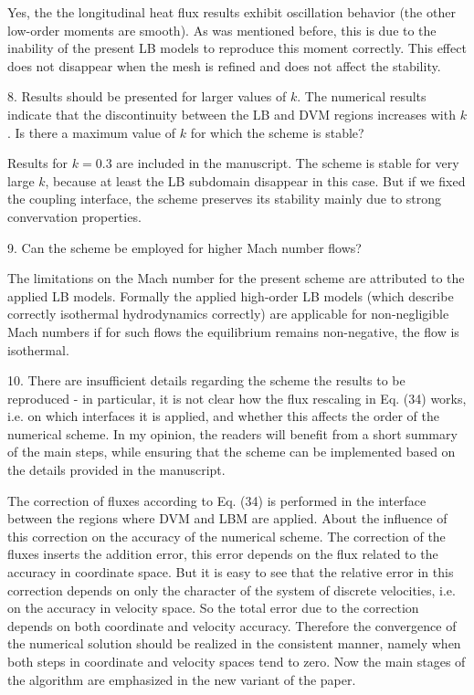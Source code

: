 \documentclass{article}
\begin{document}
Yes, the the longitudinal heat flux results exhibit oscillation behavior
(the other low-order moments are smooth). As was mentioned before,
this is due to the inability of the present LB models to reproduce this moment correctly.
This effect does not disappear when the mesh is refined and does not affect the stability.

\begin{quoting}
    8. Results should be presented for larger values of
    $k$. The numerical results indicate that the
    discontinuity between the LB and DVM regions increases
    with $k$. Is there a maximum value of $k$ for which
    the scheme is stable?
\end{quoting}

Results for $k=0.3$ are included in the manuscript.
The scheme is stable for very large $k$, because at least the LB subdomain disappear in this case.
But if we fixed the coupling interface, the scheme preserves its stability mainly due to strong convervation properties.

\begin{quoting}
    9. Can the scheme be employed for higher Mach number flows?
\end{quoting}

The limitations on the Mach number for the present scheme are attributed to the applied LB models.
Formally the applied high-order LB models (which describe correctly isothermal hydrodynamics correctly)
are applicable for non-negligible Mach numbers if for such flows the equilibrium remains non-negative,
the flow is isothermal.

\begin{quoting}
    10. There are insufficient details regarding the scheme
    the results to be reproduced - in particular, it is not
    clear how the flux rescaling in Eq. (34) works, i.e. on
    which interfaces it is applied, and whether this affects
    the order of the numerical scheme. In my opinion, the
    readers will benefit from a short summary of the main
    steps, while ensuring that the scheme can be implemented
    based on the details provided in the manuscript.
\end{quoting}

The correction of fluxes according to Eq. (34) is performed in the interface
between the regions where DVM and LBM are applied.
About the influence of this correction on the accuracy of the numerical scheme.
The correction of the fluxes inserts the addition error,
this error depends on the flux related to the accuracy in coordinate space.
But it is easy to see that the relative error in this correction
depends on only the character of the system of discrete velocities,
i.e. on the accuracy in velocity space.
So the total error due to the correction depends on both coordinate and velocity accuracy.
Therefore the convergence of the numerical solution should be realized in the consistent manner,
namely when both steps in coordinate and velocity spaces tend to zero.
Now the main stages of the algorithm are emphasized in the new variant of the paper.
\end{document}
